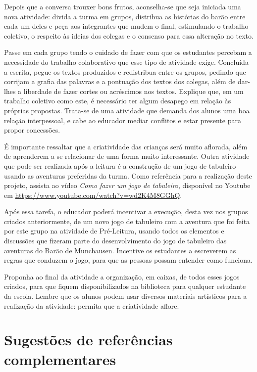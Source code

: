 \documentclass[11pt]{extarticle}
\begin{document}
Depois que a conversa trouxer bons frutos, aconselha-se que seja iniciada uma nova atividade: divida a turma em grupos, distribua as histórias do barão entre cada um deles e peça aos integrantes que mudem o final, estimulando o trabalho coletivo, o respeito às ideias dos colegas e o consenso para essa alteração no texto. 

Passe em cada grupo tendo o cuidado de fazer com que os estudantes percebam a necessidade do trabalho colaborativo que esse tipo de atividade exige. Concluída a escrita, pegue os textos produzidos e redistribua entre os grupos, pedindo que corrijam a grafia das palavras e a pontuação dos textos dos colegas, além de dar-lhes a liberdade de fazer cortes ou acréscimos nos textos. Explique que, em um trabalho coletivo como este, é necessário ter algum desapego em relação às próprias propostas. Trata-se de uma atividade que demanda dos alunos uma boa relação interpessoal, e cabe ao educador mediar conflitos e estar presente para propor concessões. 

É importante ressaltar que a criatividade das crianças será muito aflorada, além de aprenderem a se relacionar de uma forma muito interessante. Outra atividade que pode ser realizada após a leitura é a construção de um jogo de tabuleiro usando as aventuras preferidas da turma. Como referência para a realização deste projeto, assista ao vídeo \textit{Como fazer um jogo de tabuleiro}, disponível no Youtube em \url{https://www.youtube.com/watch?v=wd2K4M8GGhQ}. 

Após essa tarefa, o educador poderá incentivar a execução, desta vez nos grupos criados anteriormente, de um novo jogo de tabuleiro com a aventura que foi feita por este grupo na atividade de Pré-Leitura, usando todos os elementos e discussões que fizeram parte do desenvolvimento do jogo de tabuleiro das aventuras do Barão de Munchausen. Incentive os estudantes a escreverem as regras que conduzem o jogo, para que as pessoas possam entender como funciona.

Proponha ao final da atividade a organização, em caixas, de todos esses jogos criados, para que fiquem disponibilizados na biblioteca para qualquer estudante da escola. Lembre que os alunos podem usar diversos materiais artísticos para a realização da atividade: permita que a criatividade aflore. 


\section{Sugestões de referências complementares}
\end{document}
